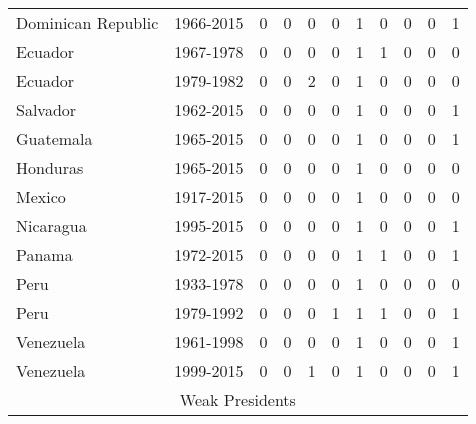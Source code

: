 \documentclass{article}
\begin{document}
\begin{landscape}
\begin{center}
\begin{scriptsize}
\begin{tabular}{lcccccccccc}
Dominican Republic&1966-2015&0&0&0&0&1&0&0&0&1\\
Ecuador&1967-1978&0&0&0&0&1&1&0&0&0\\
Ecuador&1979-1982&0&0&2&0&1&0&0&0&0\\
Salvador&1962-2015&0&0&0&0&1&0&0&0&1\\
Guatemala&1965-2015&0&0&0&0&1&0&0&0&1\\
Honduras&1965-2015&0&0&0&0&1&0&0&0&0\\
Mexico&1917-2015&0&0&0&0&1&0&0&0&0\\
Nicaragua&1995-2015&0&0&0&0&1&0&0&0&1\\
Panama&1972-2015&0&0&0&0&1&1&0&0&1\\
Peru&1933-1978&0&0&0&0&1&0&0&0&0\\
Peru&1979-1992&0&0&0&1&1&1&0&0&1\\
Venezuela&1961-1998&0&0&0&0&1&0&0&0&1\\
Venezuela&1999-2015&0&0&1&0&1&0&0&0&1\\
\multicolumn{11}{c}{Weak Presidents} \\ \hline
\end{tabular}
\end{scriptsize}


\end{center}
\end{landscape}
\end{document}
